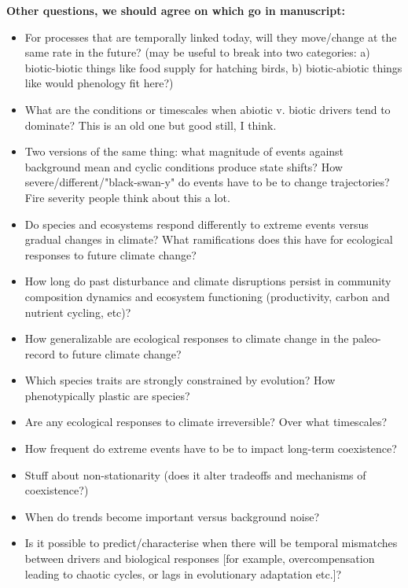 \documentclass[11pt,a4paper]{article}
\newenvironment{smitemize}{
\begin{itemize}
  \setlength{\itemsep}{1pt}
  \setlength{\parskip}{0pt}
  \setlength{\parsep}{0pt}}
{\end{itemize}
}
\begin{document}
{\bf Other questions, we should agree on which go in manuscript:}
\begin{smitemize}
\item For processes that are temporally linked today, will they move/change at the same rate in the future? (may be useful to break into two categories: a) biotic-biotic things like food supply for hatching birds, b) biotic-abiotic things like would phenology fit here?)
\item What are the conditions or timescales when abiotic v. biotic drivers tend to dominate? This is an old one but good still, I think.
\item Two versions of the same thing: what magnitude of events against background mean and cyclic conditions produce state shifts? How severe/different/"black-swan-y" do events have to be to change trajectories? Fire severity people think about this a lot.
\item Do species and ecosystems respond differently to extreme events versus gradual changes in climate? What ramifications does this have for ecological responses to future climate change? 
\item How long do past disturbance and climate disruptions persist in community composition dynamics and ecosystem functioning (productivity, carbon and nutrient cycling, etc)?
\item How generalizable are ecological responses to climate change in the paleo-record to future climate change?
\item Which species traits are strongly constrained by evolution? How phenotypically plastic are species?
\item Are any ecological responses to climate irreversible? Over what timescales?
\item How frequent do extreme events have to be to impact long-term coexistence?
\item Stuff about non-stationarity (does it alter tradeoffs and mechanisms of coexistence?)
\item When do trends become important versus background noise?
\item Is it possible to predict/characterise when there will be temporal mismatches between drivers and biological responses [for example, overcompensation leading to chaotic cycles, or lags in evolutionary adaptation etc.]?
\end{smitemize}


\clearpage
\newpage
{}\\
\end{document}
